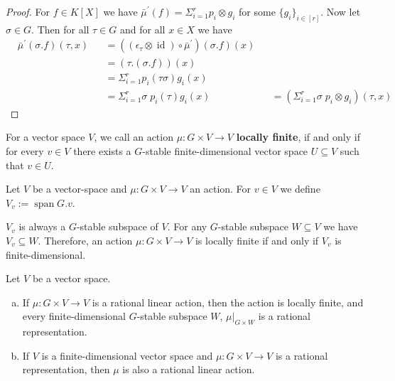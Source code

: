 \begin{proof}
  For $f \in K[X]$ we have $ \bar{\mu}^\prime (f) = \Sigma_{i=1}^r p_i \otimes g_i$ for some $\{g_i\}_{i \in [r]}$.
  Now let $\sigma \in G$.
  Then for all $\tau \in G$ and for all $x \in X$ we have
  \begin{equation}
    \begin{aligned}
      &\bar{\mu}^\prime (\sigma.f) (\tau,x)
      &&=((\epsilon_\tau \otimes \operatorname{id}) \circ \bar{\mu}^\prime) (\sigma.f) (x)\\
      &&&=(\tau.(\sigma.f)) (x)\\
      &&&=\Sigma_{i=1}^r p_i(\tau\sigma) g_i(x)\\
      &&&=\Sigma_{i=1}^r \sigma\dot{\phantom{.}}p_i(\tau) g_i(x)
      &&=(\Sigma_{i=1}^r \sigma \dot{\phantom{.}}p_i \otimes g_i) (\tau,x)
    \end{aligned}
  \end{equation}
\end{proof}

\begin{definition}
  For a vector space $V$, we call an action $\mu \colon G \times V \longrightarrow V$ \textbf{locally finite}, if and only if for every $v \in V$ there exists a $G$-stable finite-dimensional vector space $U \subseteq V$ such that $v \in U$.
\end{definition}

\begin{definition}
  Let $V$ be a vector-space and $\mu \colon G \times V \longrightarrow V$ an action.
  For $v \in V$ we define $V_v := \operatorname{span} G.v$.
\end{definition}

\begin{remark}
  $V_v$ is always a $G$-stable subspace of $V$.
  For any $G$-stable subspace $W \subseteq V$ we have $V_v \subseteq W$.
  Therefore, an action $\mu \colon G \times V \longrightarrow V$ is locally finite if and only if $V_v$ is finite-dimensional.
\end{remark}

\begin{proposition}\label{locfin}
  Let $V$ be a vector space.
  \begin{enumerate}[(a)]
  \item If $\mu \colon G \times V \longrightarrow V$ is a rational linear action, then the action is locally finite, and every
    finite-dimensional $G$-stable subspace $W$,
    $\left. \mu \right|_{G\times W}$ is a rational
    representation.
  \item If $V$ is a finite-dimensional vector space and $\mu \colon G \times V \longrightarrow V$ is a rational representation, then $\mu$ is also a rational linear action.
  \end{enumerate}
\end{proposition}

